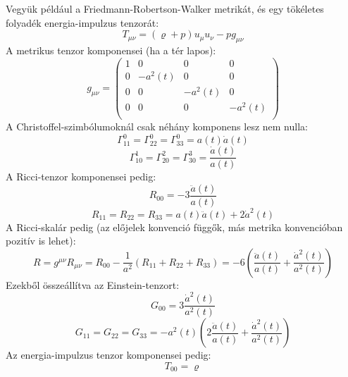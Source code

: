 \documentclass[../main.tex]{subfiles}
\begin{document}
Vegyük például a Friedmann-Robertson-Walker metrikát, és egy tökéletes folyadék energia-impulzus tenzorát:
\begin{equation}
    T_{\mu \nu} = (\varrho + p) u_{\mu} u_{\nu} - p g_{\mu \nu}
\end{equation}
A metrikus tenzor komponensei (ha a tér lapos):
\begin{equation}
    g_{\mu \nu} = \begin{pmatrix}
        1 & 0 & 0 & 0 \\
        0 & -a^2(t) & 0 & 0 \\
        0 & 0 & -a^2(t) & 0 \\
        0 & 0 & 0 & -a^2(t) \\
    \end{pmatrix}
\end{equation}
A Christoffel-szimbólumoknál csak néhány komponens lesz nem nulla:
\begin{equation}
    \Gamma^0_{11} = \Gamma^0_{22} = \Gamma^0_{33} = a(t) \dot{a}(t)
\end{equation}
\begin{equation}
    \Gamma^1_{10} = \Gamma^2_{20} = \Gamma^3_{30} = \frac{\dot{a}(t)}{a(t)}
\end{equation}
A Ricci-tenzor komponensei pedig:
\begin{equation}
    R_{00} = - 3 \frac{\ddot{a}(t)}{a(t)}
\end{equation}
\begin{equation}
    R_{11} = R_{22} = R_{33} = a(t) \ddot{a}(t) + 2 \dot{a}^2(t)
\end{equation}
A Ricci-skalár pedig (az előjelek konvenció függők, más metrika konvencióban pozitív is lehet):
\begin{equation}
    R = g^{\mu \nu} R_{\mu \nu} = R_{00} - \frac{1}{a^2} (R_{11} + R_{22} + R_{33}) = - 6 \left(\frac{\ddot{a}(t)}{a(t)} + \frac{\dot{a}^2(t)}{a^2(t)}\right)
\end{equation}
Ezekből összeállítva az Einstein-tenzort:
\begin{equation}
    G_{00} = 3 \frac{\dot{a}^2(t)}{a^2(t)}
\end{equation}
\begin{equation}
    G_{11} = G_{22} = G_{33} = - a^2(t) \left(2 \frac{\ddot{a}(t)}{a(t)} + \frac{\dot{a}^2(t)}{a^2(t)}\right)
\end{equation}
Az energia-impulzus tenzor komponensei pedig:
\begin{equation}
    T_{00} = \varrho
\end{equation}
\end{document}
